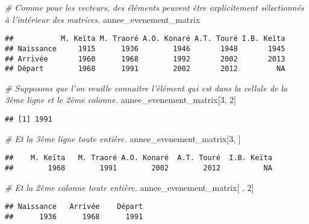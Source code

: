 \documentclass[]{book}
\newenvironment{Shaded}{\begin{snugshade}}{\end{snugshade}}
\newcommand{\DecValTok}[1]{\textcolor[rgb]{0.00,0.00,0.81}{#1}}
\newcommand{\CommentTok}[1]{\textcolor[rgb]{0.56,0.35,0.01}{\textit{#1}}}
\newcommand{\NormalTok}[1]{#1}
\begin{document}
\tiny

\begin{Shaded}
\begin{Highlighting}[]
\CommentTok{# Comme pour les vecteurs, des éléments peuvent être explicitement sélectionnés à l'intérieur des matrices.}
\NormalTok{annee_evenement_matrix}
\end{Highlighting}
\end{Shaded}

\begin{verbatim}
##           M. Keïta M. Traoré A.O. Konaré A.T. Touré I.B. Keïta
## Naissance     1915      1936        1946       1948       1945
## Arrivée       1960      1968        1992       2002       2013
## Départ        1968      1991        2002       2012         NA
\end{verbatim}

\begin{Shaded}
\begin{Highlighting}[]
\CommentTok{# Supposons que l'on veuille connaître l'élément qui est dans la cellule de la 3ème ligne et le 2ème colonne.}
\NormalTok{annee_evenement_matrix[}\DecValTok{3}\NormalTok{, }\DecValTok{2}\NormalTok{]}
\end{Highlighting}
\end{Shaded}

\begin{verbatim}
## [1] 1991
\end{verbatim}

\begin{Shaded}
\begin{Highlighting}[]
\CommentTok{# Et la 3ème ligne toute entière.}
\NormalTok{annee_evenement_matrix[}\DecValTok{3}\NormalTok{, ]}
\end{Highlighting}
\end{Shaded}

\begin{verbatim}
##    M. Keïta   M. Traoré A.O. Konaré  A.T. Touré  I.B. Keïta 
##        1968        1991        2002        2012          NA
\end{verbatim}

\begin{Shaded}
\begin{Highlighting}[]
\CommentTok{# Et la 2ème colonne toute entière.}
\NormalTok{annee_evenement_matrix[ , }\DecValTok{2}\NormalTok{]}
\end{Highlighting}
\end{Shaded}

\begin{verbatim}
## Naissance   Arrivée    Départ 
##      1936      1968      1991
\end{verbatim}
\end{document}
